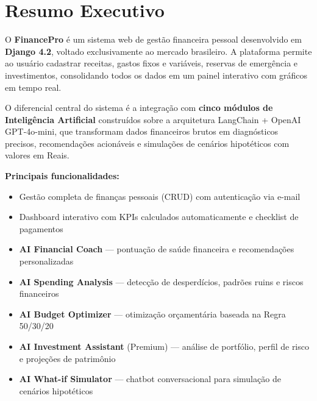 \documentclass[12pt, a4paper, oneside]{report}
\begin{document}
\clearpage\thispagestyle{empty}\mbox{}\clearpage

\chapter*{Resumo Executivo}

O \textbf{FinancePro} é um sistema web de gestão financeira pessoal desenvolvido em \textbf{Django 4.2}, voltado exclusivamente ao mercado brasileiro. A plataforma permite ao usuário cadastrar receitas, gastos fixos e variáveis, reservas de emergência e investimentos, consolidando todos os dados em um painel interativo com gráficos em tempo real.

O diferencial central do sistema é a integração com \textbf{cinco módulos de Inteligência Artificial} construídos sobre a arquitetura LangChain + OpenAI GPT-4o-mini, que transformam dados financeiros brutos em diagnósticos precisos, recomendações acionáveis e simulações de cenários hipotéticos com valores em Reais.

\medskip
\textbf{Principais funcionalidades:}
\begin{itemize}
  \item Gestão completa de finanças pessoais (CRUD) com autenticação via e-mail
  \item Dashboard interativo com KPIs calculados automaticamente e checklist de pagamentos
  \item \textbf{AI Financial Coach} — pontuação de saúde financeira e recomendações personalizadas
  \item \textbf{AI Spending Analysis} — detecção de desperdícios, padrões ruins e riscos financeiros
  \item \textbf{AI Budget Optimizer} — otimização orçamentária baseada na Regra 50/30/20
  \item \textbf{AI Investment Assistant} (Premium) — análise de portfólio, perfil de risco e projeções de patrimônio
  \item \textbf{AI What-if Simulator} — chatbot conversacional para simulação de cenários hipotéticos
\end{itemize}

\tableofcontents
\clearpage

\end{document}
